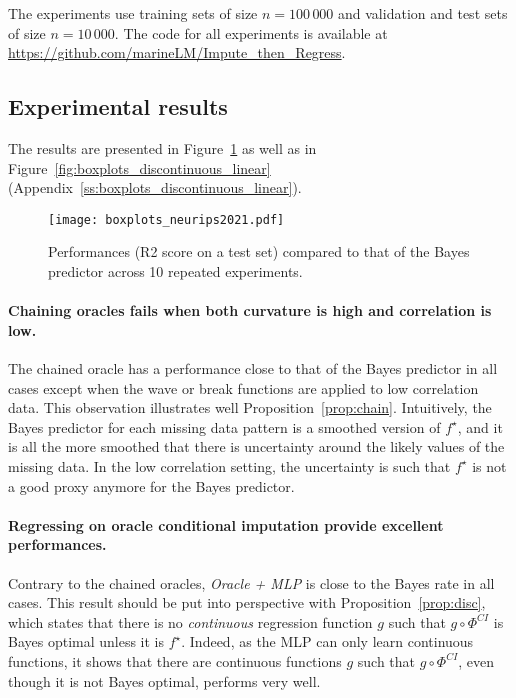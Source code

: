 \documentclass{article}
\theoremstyle{plain}
\begin{document}
The experiments use training sets of size $n=100\,000$ and validation and test sets of size $n=10\,000$. The code for all experiments is available at \url{https://github.com/marineLM/Impute\_then\_Regress}.

\subsection{Experimental results}

The results are presented in Figure~\ref{fig:boxplots} as well as in Figure~\ref{fig:boxplots_discontinuous_linear} (Appendix~\ref{ss:boxplots_discontinuous_linear}).

\begin{figure}[b!]
    \texttt{[image: boxplots\_neurips2021.pdf]}
    \caption{Performances (R2 score on a test set) compared to that of the Bayes predictor across 10 repeated experiments.}
    \label{fig:boxplots}
\end{figure}

\paragraph{Chaining oracles fails when both curvature is high and correlation is low.} The chained oracle has a performance close to that of the Bayes predictor in all cases except when the wave or break functions are applied to low correlation data. This observation illustrates well Proposition~\ref{prop:chain}. Intuitively, the Bayes predictor for each missing data pattern is a smoothed version of $f^\star$, and it is all the more smoothed that there is uncertainty around the likely values of the missing data. In the low correlation setting, the uncertainty is such that $f^\star$ is not a good proxy anymore for the Bayes predictor.

\paragraph{Regressing on oracle conditional imputation provide excellent performances.} Contrary to the chained oracles, \emph{Oracle + MLP} is close to the Bayes rate in all cases. This result should be put into perspective with Proposition~\ref{prop:disc}, which states that there is no \emph{continuous} regression function $g$ such that $g \circ \Phi^{CI}$ is Bayes optimal unless it is $f^\star$. Indeed, as the MLP can only learn continuous functions, it shows that there are continuous functions $g$ such that $g \circ \Phi^{CI}$, even though it is not Bayes optimal, performs very well.
\end{document}

